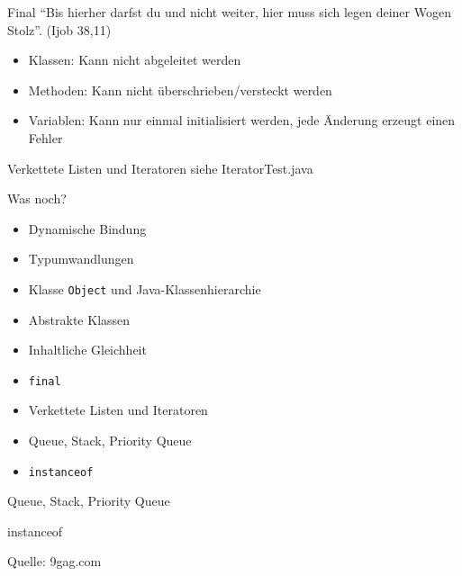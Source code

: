 \documentclass[18pt]{beamer}
\begin{document}
\begin{frame}{Final}
``Bis hierher darfst du und nicht weiter, hier muss sich legen deiner Wogen Stolz''. (Ijob 38,11)
  \pause
  
  \begin{itemize}
   \item Klassen: Kann nicht abgeleitet werden
   \item Methoden: Kann nicht überschrieben/versteckt werden
   \item Variablen: Kann nur einmal initialisiert werden, jede Änderung erzeugt einen Fehler
  \end{itemize}
\end{frame}

\begin{frame}{Verkettete Listen und Iteratoren}
 siehe IteratorTest.java
\end{frame}


\begin{frame}[fragile]{Was noch?}
\begin{itemize}
 \item Dynamische Bindung \checkmark
 \item Typumwandlungen \checkmark
 \item Klasse \verb|Object| und Java-Klassenhierarchie \checkmark
 \item Abstrakte Klassen \checkmark
 \item Inhaltliche Gleichheit \checkmark
 \item \verb|final| \checkmark
 \item Verkettete Listen und Iteratoren \checkmark
 \item Queue, Stack, Priority Queue
 \item \verb|instanceof|
\end{itemize}
\end{frame}

\begin{frame}{Queue, Stack, Priority Queue}
 
\end{frame}

\begin{frame}{instanceof}
 
\end{frame}


\begin{frame}
 
 \tiny{Quelle: 9gag.com}
\end{frame}
\end{document}
